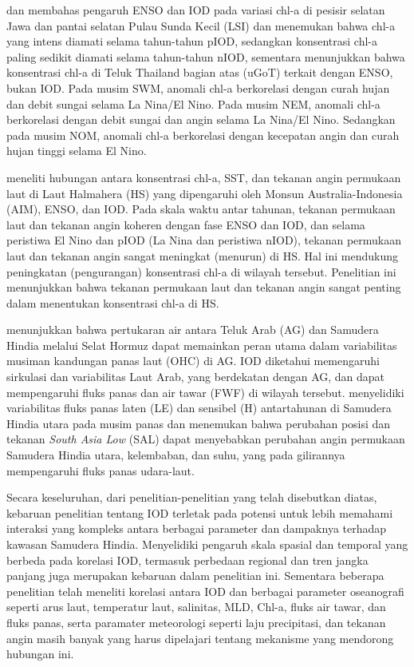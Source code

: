 \begin{spacing}{1.5}
	 dan  membahas pengaruh ENSO dan IOD pada variasi chl-a di pesisir selatan Jawa dan pantai selatan Pulau Sunda Kecil (LSI) dan menemukan bahwa chl-a yang intens diamati selama tahun-tahun pIOD, sedangkan konsentrasi chl-a paling sedikit diamati selama tahun-tahun nIOD, sementara  menunjukkan bahwa konsentrasi chl-a di Teluk Thailand bagian atas (uGoT) terkait dengan ENSO, bukan IOD. Pada musim SWM, anomali chl-a berkorelasi dengan curah hujan dan debit sungai selama La Nina/El Nino. Pada musim NEM, anomali chl-a berkorelasi dengan debit sungai dan angin selama La Nina/El Nino. Sedangkan pada musim NOM, anomali chl-a berkorelasi dengan kecepatan angin dan curah hujan tinggi selama El Nino.
	
	 meneliti hubungan antara konsentrasi chl-a, SST, dan tekanan angin permukaan laut di Laut Halmahera (HS) yang dipengaruhi oleh Monsun Australia-Indonesia (AIM), ENSO, dan IOD. Pada skala waktu antar tahunan, tekanan permukaan laut dan tekanan angin koheren dengan fase ENSO dan IOD, dan selama peristiwa El Nino dan pIOD (La Nina dan peristiwa nIOD), tekanan permukaan laut dan tekanan angin sangat meningkat (menurun) di HS. Hal ini mendukung peningkatan (pengurangan) konsentrasi chl-a di wilayah tersebut. Penelitian ini menunjukkan bahwa tekanan permukaan laut dan tekanan angin sangat penting dalam menentukan konsentrasi chl-a di HS.
	
	 menunjukkan bahwa pertukaran air antara Teluk Arab (AG) dan Samudera Hindia melalui Selat Hormuz dapat memainkan peran utama dalam variabilitas musiman kandungan panas laut (OHC) di AG. IOD diketahui memengaruhi sirkulasi dan variabilitas Laut Arab, yang berdekatan dengan AG, dan dapat mempengaruhi fluks panas dan air tawar (FWF) di wilayah tersebut.   menyelidiki variabilitas fluks panas laten (LE) dan sensibel (H) antartahunan di Samudera Hindia utara pada musim panas dan menemukan bahwa perubahan posisi dan tekanan \textit{South Asia Low} (SAL) dapat menyebabkan perubahan angin permukaan Samudera Hindia utara, kelembaban, dan suhu, yang pada gilirannya mempengaruhi fluks panas udara-laut.
	
	Secara keseluruhan, dari penelitian-penelitian yang telah disebutkan diatas, kebaruan penelitian tentang IOD terletak pada potensi untuk lebih memahami interaksi yang kompleks antara berbagai parameter dan dampaknya terhadap kawasan Samudera Hindia. Menyelidiki pengaruh skala spasial dan temporal yang berbeda pada korelasi IOD, termasuk perbedaan regional dan tren jangka panjang juga merupakan kebaruan dalam penelitian ini. Sementara beberapa penelitian telah meneliti korelasi antara IOD dan berbagai parameter oseanografi seperti arus laut, temperatur laut, salinitas, MLD, Chl-a, fluks air tawar, dan fluks panas, serta paramater meteorologi seperti laju precipitasi, dan tekanan angin masih banyak yang harus dipelajari tentang mekanisme yang mendorong hubungan ini.
	
\end{spacing}
\vspace{-1pc}

